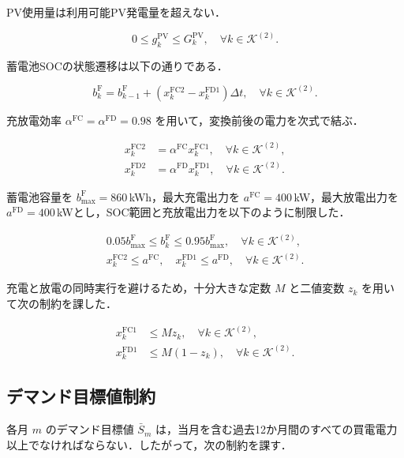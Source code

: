 \documentclass[a4paper,11pt,dvipdfmx]{jsarticle}
\begin{document}
PV使用量は利用可能PV発電量を超えない．

\begin{equation}
    0 \leq g^{\mathrm{PV}}_{k} \leq G^{\mathrm{PV}}_{k},
    \quad \forall k \in \mathcal{K}^{(2)}.
\end{equation}

蓄電池SOCの状態遷移は以下の通りである．

\begin{equation}
    b^{\mathrm{F}}_{k}
    =
    b^{\mathrm{F}}_{k-1}
    +
    \left(
    x^{\mathrm{FC2}}_{k}
    -
    x^{\mathrm{FD1}}_{k}
    \right)\Delta t,
    \quad \forall k \in \mathcal{K}^{(2)}.
\end{equation}

充放電効率 $\alpha^{\mathrm{FC}}=\alpha^{\mathrm{FD}}=0.98$ を用いて，変換前後の電力を次式で結ぶ．

\begin{align}
    x^{\mathrm{FC2}}_{k} & = \alpha^{\mathrm{FC}} x^{\mathrm{FC1}}_{k},
    \quad \forall k \in \mathcal{K}^{(2)},                              \\
    x^{\mathrm{FD2}}_{k} & = \alpha^{\mathrm{FD}} x^{\mathrm{FD1}}_{k},
    \quad \forall k \in \mathcal{K}^{(2)}.
\end{align}

蓄電池容量を $b^{\mathrm{F}}_{\max}=860$\,kWh，最大充電出力を $a^{\mathrm{FC}}=400$\,kW，最大放電出力を $a^{\mathrm{FD}}=400$\,kWとし，SOC範囲と充放電出力を以下のように制限した．

\begin{align}
    0.05 b^{\mathrm{F}}_{\max}
    \leq b^{\mathrm{F}}_{k}
    \leq 0.95 b^{\mathrm{F}}_{\max},
    \quad \forall k \in \mathcal{K}^{(2)}, \\
    x^{\mathrm{FC2}}_{k} \leq a^{\mathrm{FC}},
    \quad
    x^{\mathrm{FD1}}_{k} \leq a^{\mathrm{FD}},
    \quad \forall k \in \mathcal{K}^{(2)}.
\end{align}

充電と放電の同時実行を避けるため，十分大きな定数 $M$ と二値変数 $z_k$ を用いて次の制約を課した．

\begin{align}
    x^{\mathrm{FC1}}_{k} & \leq M z_k,
    \quad \forall k \in \mathcal{K}^{(2)}, \\
    x^{\mathrm{FD1}}_{k} & \leq M(1-z_k),
    \quad \forall k \in \mathcal{K}^{(2)}.
\end{align}

\subsection{デマンド目標値制約}
各月 $m$ のデマンド目標値 $\bar{S}_{m}$ は，当月を含む過去12か月間のすべての買電電力以上でなければならない．したがって，次の制約を課す．
\end{document}
